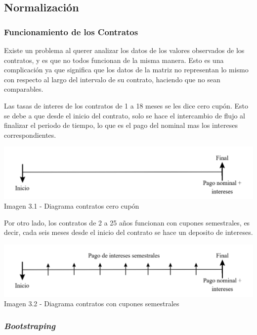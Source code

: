 \subsection{Normalización}

\subsubsection{Funcionamiento de los Contratos}

\qquad Existe un problema al querer analizar los datos de los valores observados de los contratos, y es que no todos funcionan de la misma manera. Esto es una complicación ya que significa que los datos de la matriz no representan lo mismo con respecto al largo del intervalo de su contrato, haciendo que no sean comparables.

\qquad Las tasas de interes de los contratos de 1 a 18 meses se les dice cero cupón. Esto se debe a que desde el inicio del contrato, solo se hace el intercambio de flujo al finalizar el periodo de tiempo, lo que es el pago del nominal mas los intereses correspondientes.\\

\begin{center}
    \includegraphics[scale=0.5]{images/diagrama_contratos_cero_cupon.png}
    {\small Imagen 3.1 - Diagrama contratos cero cupón}
\end{center}

\qquad Por otro lado, los contratos de 2 a 25 años funcionan con cupones semestrales, es decir, cada seis meses desde el inicio del contrato se hace un deposito de intereses.
\begin{center}
    \includegraphics[scale=0.5]{images/diagrama_contratos_semestrales.png}
    {\small Imagen 3.2 - Diagrama contratos con cupones semestrales}
\end{center}

\subsubsection{\textit{Bootstraping}}

